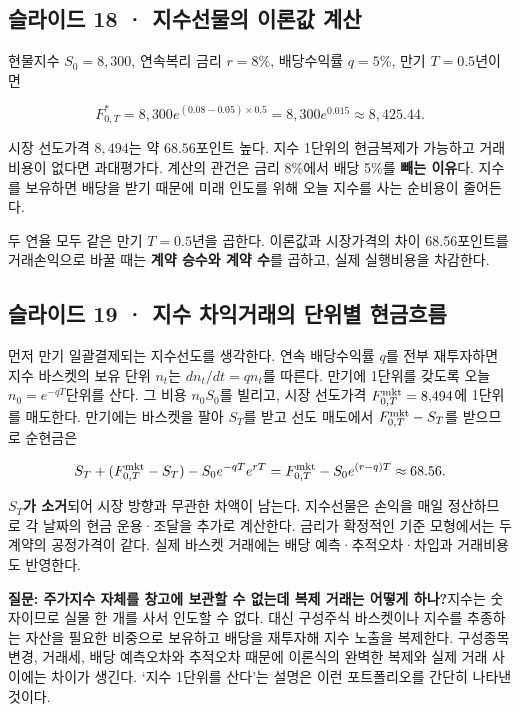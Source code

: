 \documentclass[11pt,a4paper]{article}
\begin{document}
\subsection{슬라이드 18 · 지수선물의 이론값 계산}
현물지수 $S_0=8,300$, 연속복리 금리 $r=8\%$, 배당수익률 $q=5\%$, 만기 $T=0.5$년이면\par

\[
F^*_{0,T}=8{,}300e^{(0.08-0.05)\times0.5}
=8{,}300e^{0.015}\approx8{,}425.44.
\]

시장 선도가격 $8,494$는 약 $68.56$포인트 높다. 지수 1단위의 현금복제가 가능하고 거래비용이 없다면 과대평가다. 계산의 관건은 금리 8\%에서 배당 5\%를 \textbf{빼는 이유}다. 지수를 보유하면 배당을 받기 때문에 미래 인도를 위해 오늘 지수를 사는 순비용이 줄어든다.\par

두 연율 모두 같은 만기 $T=0.5$년을 곱한다. 이론값과 시장가격의 차이 68.56포인트를 거래손익으로 바꿀 때는 \textbf{계약 승수와 계약 수}를 곱하고, 실제 실행비용을 차감한다.\par

\subsection{슬라이드 19 · 지수 차익거래의 단위별 현금흐름}
먼저 만기 일괄결제되는 지수선도를 생각한다. 연속 배당수익률 $q$를 전부 재투자하면 지수 바스켓의 보유 단위 $n_t$는 $dn_t/dt=qn_t$를 따른다. 만기에 1단위를 갖도록 오늘 $n_0=e^{-qT}$단위를 산다. 그 비용 $n_0S_0$를 빌리고, 시장 선도가격 $F^{\rm mkt}_{0,T}=8{,}494$에 1단위를 매도한다. 만기에는 바스켓을 팔아 $S_T$를 받고 선도 매도에서 $F^{\rm mkt}_{0,T}-S_T$를 받으므로 순현금은\par

\[
S_T+(F^{\rm mkt}_{0,T}-S_T)-S_0e^{-qT}e^{rT}
=F^{\rm mkt}_{0,T}-S_0e^{(r-q)T}\approx68.56.
\]

\textbf{$S_T$가 소거}되어 시장 방향과 무관한 차액이 남는다. 지수선물은 손익을 매일 정산하므로 각 날짜의 현금 운용·조달을 추가로 계산한다. 금리가 확정적인 기준 모형에서는 두 계약의 공정가격이 같다. 실제 바스켓 거래에는 배당 예측·추적오차·차입과 거래비용도 반영한다.\par

\par\medskip\noindent\textbf{질문: 주가지수 자체를 창고에 보관할 수 없는데 복제 거래는 어떻게 하나?}\quad 지수는 숫자이므로 실물 한 개를 사서 인도할 수 없다. 대신 구성주식 바스켓이나 지수를 추종하는 자산을 필요한 비중으로 보유하고 배당을 재투자해 지수 노출을 복제한다. 구성종목 변경, 거래세, 배당 예측오차와 추적오차 때문에 이론식의 완벽한 복제와 실제 거래 사이에는 차이가 생긴다. ‘지수 1단위를 산다’는 설명은 이런 포트폴리오를 간단히 나타낸 것이다.\par
\end{document}

